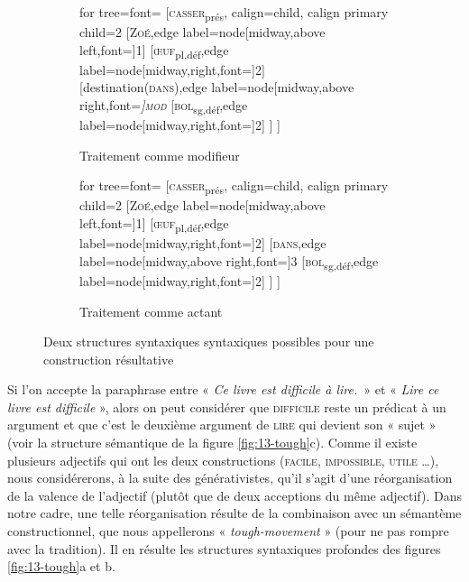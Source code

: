 {\begin{figure}[H]
	\begin{subfigure}[b]{0.5\textwidth}
		\centering
		\begin{forest} for tree={font=\normalfont}
			[\textsc{casser}\textsubscript{prés}, calign=child, calign primary child=2
			[\textsc{Zoé},edge label={node[midway,above left,font=\footnotesize]{1}}]
			[\textsc{œuf}\textsubscript{pl,déf},edge label={node[midway,right,font=\footnotesize]{2}}]
			[destination(\textsc{dans}),edge label={node[midway,above right,font=\footnotesize\itshape]{\textsc{mod}}}
			[\textsc{bol}\textsubscript{sg,déf},edge label={node[midway,right,font=\footnotesize]{2}}]
			]
			]
		\end{forest}
		\caption{Traitement comme modifieur}
	\end{subfigure}%
	\hfill
	\begin{subfigure}[b]{0.5\textwidth}
		\centering
		\begin{forest} for tree={font=\normalfont}
			[\textsc{casser}\textsubscript{prés}, calign=child, calign primary child=2
			[\textsc{Zoé},edge label={node[midway,above left,font=\footnotesize]{1}}]
			[\textsc{œuf}\textsubscript{pl,déf},edge label={node[midway,right,font=\footnotesize]{2}}]
			[\textsc{dans},edge label={node[midway,above right,font=\footnotesize]{3}}
			[\textsc{bol}\textsubscript{sg,déf},edge label={node[midway,right,font=\footnotesize]{2}}]
			]
			]
		\end{forest}
		\caption{Traitement comme actant}
	\end{subfigure}
\caption{Deux structures syntaxiques syntaxiques possibles pour une construction résultative}
\end{figure}

 Si l’on accepte la paraphrase entre « \textit{Ce livre est difficile à lire.}~» et « \textit{Lire ce livre est difficile} », alors on peut considérer que \textsc{difficile} reste un prédicat à un argument et que c’est le deuxième argument de \textsc{lire} qui devient son « sujet » (voir la structure sémantique de la figure \ref{fig:13-tough}c). Comme il existe plusieurs adjectifs qui ont les deux constructions (\textsc{facile}, \textsc{impossible}, \textsc{utile} …), nous considérerons, à la suite des générativistes, qu’il s’agit d’une réorganisation de la valence de l’adjectif (plutôt que de deux acceptions du même adjectif). Dans notre cadre, une telle réorganisation résulte de la combinaison avec un sémantème constructionnel, que nous appellerons « \textit{tough-movement} » (pour ne pas rompre avec la tradition). Il en résulte les structures syntaxiques profondes des figures \ref{fig:13-tough}a et b.

}
